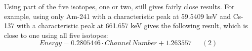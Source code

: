 Using part of the five isotopes, one or two, still gives fairly close results. For example, using only Am-241 with a characteristic peak at 59.5409 keV and Cs-137 with a characteristic peak at 661.657 keV gives the following result, which is close to one using all five isotopes:
\[{Energy}=0.2805446 \cdot Channel\,Number+1.263557\,\,\,\,\,\,\,\,\,(2)\]
